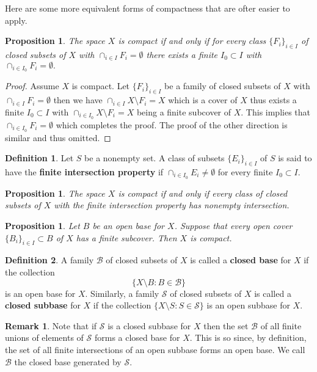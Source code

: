 \documentclass[11pt,a4paper]{article}
\theoremstyle{definition}
\newtheorem{definition}{Definition}[section]
\newtheorem{remark}{Remark}[section]
\theoremstyle{plain}
\newtheorem{proposition}[theorem]{Proposition}
\begin{document}
  Here are some more equivalent forms of compactness that are ofter easier
  to apply.
  \begin{proposition}
    The space $X$ is compact if and only if for every class 
    $\{F_i\}_{i \in I}$ of closed subsets of $X$ with 
    $\cap_{i \in I}{F_i} = \emptyset$ there exists a finite 
    $I_0 \subset I$ with $\cap_{i \in I_0} {F_i} = \emptyset.$
  \end{proposition}
  \begin{proof}
    Assume $X$ is compact. Let $\{F_i\}_{i \in I}$ be a family of closed 
    subsets of $X$ with $\cap_{i \in I}{F_i} = \emptyset$ then 
    we have
    $\cap_{i \in I} {X \setminus F_i} = X$ which is a cover of $X$
    thus exists a finite $I_0 \subset I$ with 
    $\cap_{i \in I_0} {X \setminus F_i} = X$ being a finite subcover
    of $X$. This implies that $\cap_{i \in I_0} {F_i} = \emptyset$
    which completes the proof. The proof of the other direction is
    similar and thus omitted. 
  \end{proof}
  \begin{definition}
    Let $S$ be a nonempty set. A class of subsets $\{E_i\}_{i \in I}$ of 
    $S$ is said to have the \textbf{finite intersection property} if 
    $\cap_{i \in I_0}{E_i} \neq \emptyset$ for every finite 
    $I_0 \subset I$.
  \end{definition}
  \begin{proposition}
    The space $X$ is compact if and only if every class of closed
    subsets of $X$ with the finite intersection property has nonempty 
    intersection.
  \end{proposition}
  \begin{proposition}
    Let $B$ be an open base for $X$. Suppose that every open cover
    $\{B_i\}_{i \in I} \subset B$ of $X$ has a finite subcover. Then $X$ 
    is compact.
  \end{proposition}
  \begin{definition}
    A family $\mathcal{B}$ of closed subsets of $X$ is called a 
    \textbf{closed base} for $X$ if the collection
    \[
      \{X \setminus B \colon B \in \mathcal{B}\}
    \]
    is an open base for $X$. Similarly, a family $\mathcal{S}$ of
    closed subsets of $X$ is called a \textbf{closed subbase} for $X$ 
    if the collection $\{X \setminus S \colon S \in \mathcal{S}\}$ is 
    an open subbase for $X$.
  \end{definition}
  \begin{remark}
    Note that if $\mathcal{S}$ is a closed subbase for $X$ then the set 
    $\mathcal{B}$ of all finite unions of elements of $\mathcal{S}$ forms 
    a closed base for $X$. This is so since, by definition,
    the set of all finite intersections of an open subbase forms an open 
    base. We call $\mathcal{B}$ the closed base generated by 
    $\mathcal{S}$.
  \end{remark}
\end{document}
